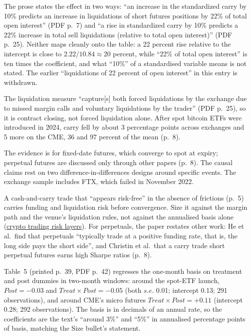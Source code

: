 \begin{qfevidence}
\begin{itemize}
The prose states the effect in two ways: ``an increase in the standardized carry by 10\% predicts an increase in liquidations of short futures positions by 22\% of total open interest'' (PDF p.~7) and ``a rise in standardized carry by 10\% predicts a 22\% increase in total sell liquidations (relative to total open interest)'' (PDF p.~25). Neither maps cleanly onto the table: a 22 percent rise relative to the intercept is close to $2.22/10.84\approx20$ percent, while ``22\% of total open interest'' is ten times the coefficient, and what ``10\%'' of a standardised variable means is not stated. The earlier ``liquidations of 22 percent of open interest'' in this entry is withdrawn.

The liquidation measure ``capture[s] both forced liquidations by the exchange due to missed margin calls and voluntary liquidations by the trader'' (PDF p.~25), so it is contract closing, not forced liquidation alone. After spot bitcoin ETFs were introduced in 2024, carry fell by about 3 percentage points across exchanges and 5 more on the CME, 36 and 97 percent of the mean (p.~8).
\end{itemize}

 The evidence is for fixed-date futures, which converge to spot at expiry; perpetual futures are discussed only through other papers (p.~8). The causal claims rest on two difference-in-differences designs around specific events. The exchange sample includes FTX, which failed in November 2022.

 A cash-and-carry trade that ``appears risk-free'' in the absence of frictions (p.~5) carries funding and liquidation risk before convergence. Size it against the margin path and the venue's liquidation rules, not against the annualised basis alone (\hyperref[def:crypto-trading-risk-layers]{crypto trading risk layers}). For perpetuals, the paper restates other work: He et al.\ find that perpetuals ``typically trade at a positive funding rate, that is, the long side pays the short side'', and Christin et al.\ that a carry trade short perpetual futures earns high Sharpe ratios (p.~8).

 Table~5 (printed p.~39, PDF p.~42) regresses the one-month basis on treatment and post dummies in two-month windows: around the spot-ETF launch, $Post=-0.03$ and $Treat\times Post=-0.05$ (both $s.e.$ 0.01; intercept 0.13; 291 observations), and around CME's micro futures $Treat\times Post=+0.11$ (intercept 0.28; 292 observations). The basis is in decimals of an annual rate, so the coefficients are the text's ``around 3\%'' and ``5\%'' in annualised percentage points of basis, matching the Size bullet's statement.


\end{qfevidence}
